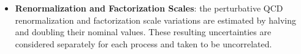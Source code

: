 \begin{itemize}
  \item \textbf{Renormalization and Factorization Scales}: the perturbative QCD renormalization and factorization scale variations are estimated by halving and doubling their nominal values. These resulting uncertainties are considered separately for each process and taken to be uncorrelated.
\end{itemize}

%
%
%
%
